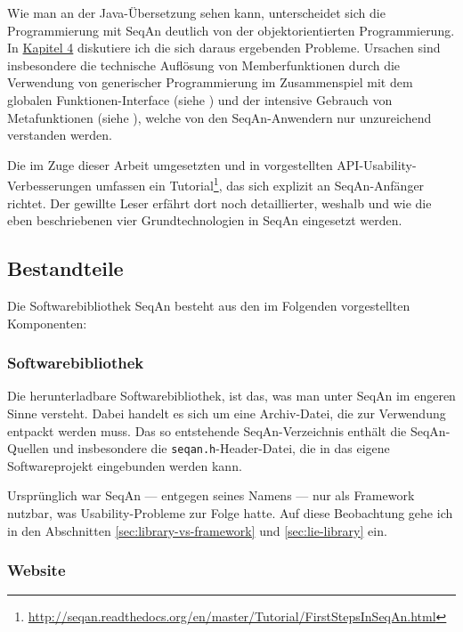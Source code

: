 \bigskip

Wie man an der Java-Übersetzung sehen kann, unterscheidet sich die Programmierung mit SeqAn deutlich von der objektorientierten Programmierung. In \href{sec:gt}{Kapitel 4} diskutiere ich die sich daraus ergebenden Probleme. Ursachen sind insbesondere die technische Auflösung von Memberfunktionen durch die Verwendung von generischer Programmierung im Zusammenspiel mit dem globalen Funktionen-Interface (siehe ) und der intensive Gebrauch von Metafunktionen (siehe ), welche von den SeqAn-Anwendern nur unzureichend verstanden werden.

Die im Zuge dieser Arbeit umgesetzten und in  vorgestellten API-Usability-Verbesserungen umfassen ein Tutorial\footnote{\url{http://seqan.readthedocs.org/en/master/Tutorial/FirstStepsInSeqAn.html}}, das sich explizit an SeqAn-Anfänger richtet. Der gewillte Leser erfährt dort noch detaillierter, weshalb und wie die eben beschriebenen vier Grundtechnologien in SeqAn eingesetzt werden.



\subsection{Bestandteile}

Die Softwarebibliothek SeqAn besteht aus den im Folgenden vorgestellten Komponenten:

\subsubsection{Softwarebibliothek}
Die herunterladbare Softwarebibliothek, ist das, was man unter SeqAn im engeren Sinne versteht. Dabei handelt es sich um eine Archiv-Datei, die zur Verwendung entpackt werden muss. Das so entstehende SeqAn-Verzeichnis enthält die SeqAn-Quellen und insbesondere die \texttt{seqan.h}-Header-Datei, die in das eigene Softwareprojekt eingebunden werden kann.

Ursprünglich war SeqAn --- entgegen seines Namens --- nur als Framework nutzbar, was Usability-Probleme zur Folge hatte. Auf diese Beobachtung gehe ich in den Abschnitten \ref{sec:library-vs-framework} und \ref{sec:lie-library} ein.

\subsubsection{Website}

